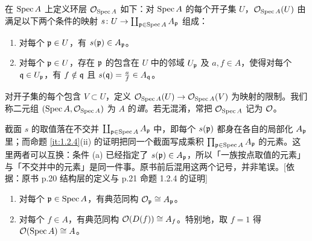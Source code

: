 在 $\operatorname{Spec} A$ 上定义环层 $\mathcal{O}_{\operatorname{Spec} A}$ 如下：对 $\operatorname{Spec} A$ 的每个开子集 $U$，$\mathcal{O}_{\operatorname{Spec} A}(U)$ 由满足以下两个条件的映射 $s\colon U\to\coprod_{\mathfrak{p}\in\operatorname{Spec} A}A_{\mathfrak{p}}$ 组成：
\begin{enumerate}[label=(\alph*)]
  \item 对每个 $\mathfrak{p}\in U$，有 $s(\mathfrak{p})\in A_{\mathfrak{p}}$。
  \item 对每个 $\mathfrak{p}\in U$，存在 $\mathfrak{p}$ 的包含在 $U$ 中的邻域 $U_{\mathfrak{p}}$ 及 $a,f\in A$，使得对每个 $\mathfrak{q}\in U_{\mathfrak{p}}$，有 $f\notin\mathfrak{q}$ 且 $s(\mathfrak{q})=\frac{a}{f}\in A_{\mathfrak{q}}$。
\end{enumerate}

对开子集的每个包含 $V\subset U$，定义 $\mathcal{O}_{\operatorname{Spec} A}(U)\to\mathcal{O}_{\operatorname{Spec} A}(V)$ 为映射的限制。我们称二元组 $(\operatorname{Spec} A,\mathcal{O}_{\operatorname{Spec} A})$ 为 $A$ 的\emph{谱}。若无混淆，常把 $\mathcal{O}_{\operatorname{Spec} A}$ 记为 $\mathcal{O}$。

\begin{tnote}
截面 $s$ 的取值落在不交并 $\coprod_{\mathfrak{p}\in\operatorname{Spec} A}A_{\mathfrak{p}}$ 中，即每个 $s(\mathfrak{p})$ 都身在各自的局部化 $A_{\mathfrak{p}}$ 里；而命题 \ref{it:1.2.4}(ii) 的证明把同一个截面写成乘积 $\prod_{\mathfrak{p}\in\operatorname{Spec} A}A_{\mathfrak{p}}$ 的元素。这里两者可以互换：条件 (a) 已经指定了 $s(\mathfrak{p})\in A_{\mathfrak{p}}$，所以「一族按点取值的元素」与「不交并中的元素」是同一件事。原书前后混用这两个记号，并非笔误。[依据：原书 p.20 结构层的定义与 p.21 命题 1.2.4 的证明]
\end{tnote}

\begin{proposition}\label{it:1.2.4}
\begin{enumerate}[label=(\roman*)]
  \item 对每个 $\mathfrak{p}\in\operatorname{Spec} A$，有典范同构 $\mathcal{O}_{\mathfrak{p}}\cong A_{\mathfrak{p}}$。
  \item 对每个 $f\in A$，有典范同构 $\mathcal{O}(D(f))\cong A_f$。特别地，取 $f=1$ 得 $\mathcal{O}(\operatorname{Spec} A)\cong A$。
\end{enumerate}
\end{proposition}

